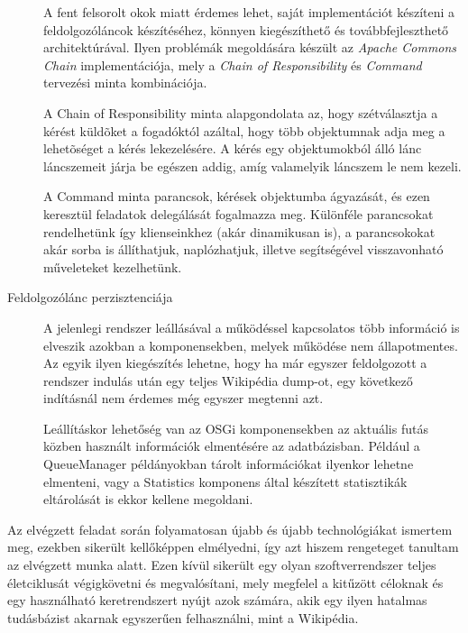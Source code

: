 \begin{description}
A fent felsorolt okok miatt érdemes lehet, saját implementációt készíteni a feldolgozóláncok készítéséhez, könnyen kiegészíthető és továbbfejleszthető architektúrával. Ilyen problémák megoldására készült az \textit{Apache Commons Chain} \cite{commonschain} implementációja, mely a \textit{Chain of Responsibility} és \textit{Command} tervezési minta kombinációja.
    
A Chain of Responsibility minta alapgondolata az, hogy szétválasztja a kérést küldõket a fogadóktól azáltal, hogy több objektumnak adja meg a lehetõséget a kérés lekezelésére. A kérés egy objektumokból álló lánc láncszemeit járja be egészen addig, amíg valamelyik láncszem le nem kezeli.
    
A Command minta parancsok, kérések objektumba ágyazását, és ezen keresztül feladatok delegálását fogalmazza meg. Különféle parancsokat rendelhetünk így klienseinkhez (akár dinamikusan is), a parancsokokat akár sorba is állíthatjuk, naplózhatjuk, illetve segítségével visszavonható műveleteket kezelhetünk.
    
    \item[Feldolgozólánc perzisztenciája]

A jelenlegi rendszer leállásával a működéssel kapcsolatos több információ is elveszik azokban a komponensekben, melyek működése nem állapotmentes. Az egyik ilyen kiegészítés lehetne, hogy ha már egyszer feldolgozott a rendszer indulás után egy teljes Wikipédia dump-ot, egy következő indításnál nem érdemes még egyszer megtenni azt.

Leállításkor lehetőség van az OSGi komponensekben az aktuális futás közben használt információk elmentésére az adatbázisban. Például a QueueManager példányokban tárolt információkat ilyenkor lehetne elmenteni, vagy a Statistics komponens által készített statisztikák eltárolását is ekkor kellene megoldani.
\end{description}

Az elvégzett feladat során folyamatosan újabb és újabb technológiákat ismertem meg, ezekben sikerült kellőképpen elmélyedni, így azt hiszem rengeteget tanultam az elvégzett munka alatt. Ezen kívül sikerült egy olyan szoftverrendszer teljes életciklusát végigkövetni és megvalósítani, mely megfelel a kitűzött céloknak és egy használható keretrendszert nyújt azok számára, akik egy ilyen hatalmas tudásbázist akarnak egyszerűen felhasználni, mint a Wikipédia.


